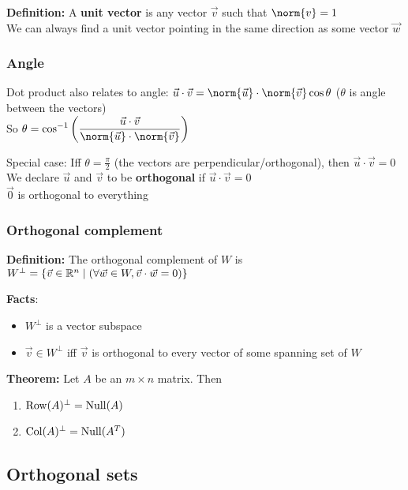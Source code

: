 \textbf{Definition:} A \textbf{unit vector} is any vector $\Vec v$ such that $\norm{v} = 1$\\
We can always find a unit vector pointing in the same direction as some vector $\Vec w$

\subsubsection*{Angle}

Dot product also relates to angle: $\Vec u \cdot \Vec v = \norm{\Vec u}\cdot\norm{\Vec v}\cos\theta$ ($\theta$ is angle between the vectors)\\
So $\displaystyle \theta = \cos^{-1}\paren{\frac{\Vec u \cdot \Vec v}{\norm{\Vec u}\cdot\norm{\Vec v}}}$

Special case: Iff $\displaystyle \theta = \frac{\pi}{2}$ (the vectors are perpendicular/orthogonal), then $\Vec u \cdot \Vec v = 0$\\
We declare $\Vec u$ and $\Vec v$ to be \textbf{orthogonal} if $\Vec u \cdot \Vec v = 0$\\
$\Vec 0$ is orthogonal to everything

\subsubsection*{Orthogonal complement}

\textbf{Definition:} The orthogonal complement of $W$ is $W^{\bot} = \left\{\Vec v \in \mathbb{R}^n \mid (\forall \Vec w \in W, \Vec v \cdot \Vec w = 0) \right\}$

\textbf{Facts}:
\begin{itemize}
    \item $W^{\bot}$ is a vector subspace
    \item $\Vec v \in W^{\bot}$ iff $\Vec v$ is orthogonal to every vector of some spanning set of $W$
\end{itemize}

\textbf{Theorem:} Let $A$ be an $m \times n$ matrix. Then
\begin{enumerate}
    \item $\operatorname{Row}(A)^{\bot} = \operatorname{Null}(A)$
    \item $\operatorname{Col}(A)^{\bot} = \operatorname{Null}(A^T)$
\end{enumerate}

\subsection{Orthogonal sets}

